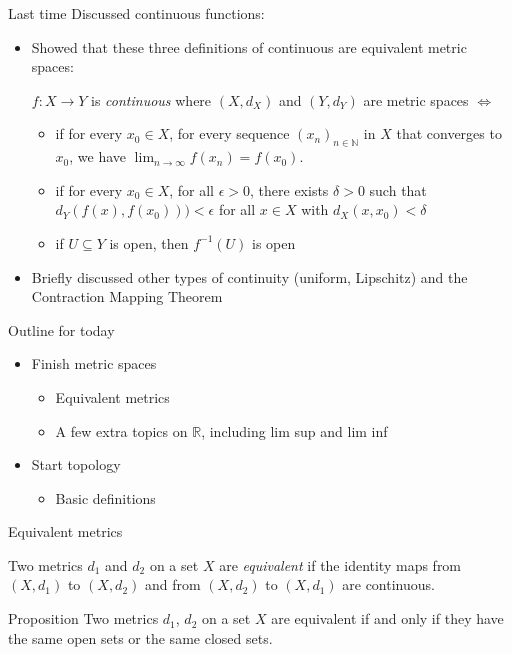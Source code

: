 \documentclass [aspectratio=169]{beamer}
\newcommand{\R}{{\mathbb{R}}}
\newcommand{\N}{{\mathbb{N}}}
\newcommand{\inv}{{-1}}
\begin{document}
\begin{frame}{Last time}
Discussed continuous functions:
 \vspace{0.5em}
	\begin{itemize}
	\setlength\itemsep{0.7em}
	\item Showed that these three definitions of continuous are equivalent metric spaces: \\
	\vspace{0.5em}
	
	$f:X \to Y$ is \emph{continuous} where $(X,d_X)$ and $(Y,d_Y)$ are metric spaces $\Leftrightarrow$
	\begin{itemize}
	\setlength\itemsep{0.4em}
		\item  if for every $x_0 \in X$, for every sequence $(x_n)_{n\in\N}$ in $X$ that converges to $x_0$, we have $\lim_{n\to\infty}f(x_n)=f(x_0)$.
		\item   if for every $x_0 \in X$, for all $\epsilon>0$, there exists $\delta > 0$ such that $d_Y(f(x),f(x_0))) < \epsilon$ for all $x \in X$ with $d_X(x,x_0) < \delta$
		\item if $U \subseteq Y$ is open, then $f^\inv(U)$ is open
	\end{itemize}
	\item Briefly discussed other types of continuity (uniform, Lipschitz) and the Contraction Mapping Theorem
	\end{itemize}
\end{frame}

\begin{frame}{Outline for today}
    \begin{itemize}
      \setlength\itemsep{1em}
    	\item Finish metric spaces
	\begin{itemize}
	\setlength\itemsep{0.3em}
	\item Equivalent metrics
	\item A few extra topics on $\R$, including lim sup and lim inf
	\end{itemize}
	\item Start topology
	\begin{itemize}
	\setlength\itemsep{0.3em}
	\item Basic definitions
	\end{itemize}
    \end{itemize}
\end{frame}


\begin{frame}{Equivalent metrics}
\begin{definition}
Two metrics $d_1$ and $d_2$ on a set $X$ are \emph{equivalent} if the identity maps from $(X,d_1)$ to $(X,d_2)$ and from $(X,d_2)$ to $(X,d_1)$ are continuous. 
\end{definition}

\vspace{1em}

\begin{exampleblock}{Proposition}
Two metrics $d_1$, $d_2$ on a set $X$ are equivalent if and only if they have the same open sets or the same closed sets.
\end{exampleblock}
\end{frame}
\end{document}
